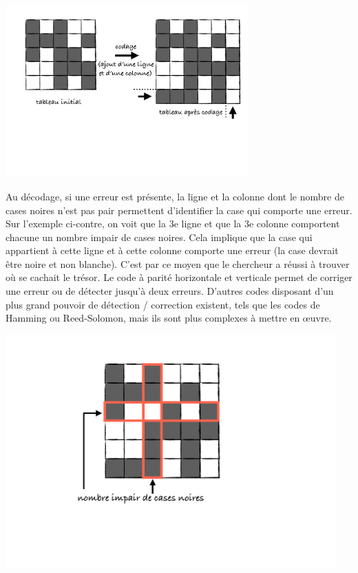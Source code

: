 \documentclass[frenchb,11pt]{article}
\begin{document}
\begin{center}
\includegraphics[width=0.70\textwidth]{hv-parity.pdf}
\end{center}

\vskip 0.1cm

\hspace*{-\parindent}%
\begin{minipage}{0.60\linewidth}
Au décodage, si une erreur est présente, la ligne et la colonne dont le nombre de cases noires n'est pas pair permettent d'identifier la case qui comporte une erreur.
Sur l'exemple ci-contre, on voit que la 3e ligne et que la 3e colonne comportent chacune un nombre impair de cases noires.
Cela implique que la case qui appartient à cette ligne et à cette colonne comporte une erreur (la case devrait être noire et non blanche).
C'est par ce moyen que le chercheur a réussi à trouver où se cachait le trésor.
Le code à parité horizontale et verticale permet de corriger une erreur ou de détecter jusqu'à deux erreurs.
D'autres codes disposant d'un plus grand pouvoir de détection / correction existent, tels que les codes de Hamming ou Reed-Solomon, mais ils sont plus complexes à mettre en \oe{}uvre.
\end{minipage}
\begin{minipage}{0.4\linewidth}
\includegraphics[width=0.95\textwidth]{hv-error.pdf}
\end{minipage}

\end{document}
